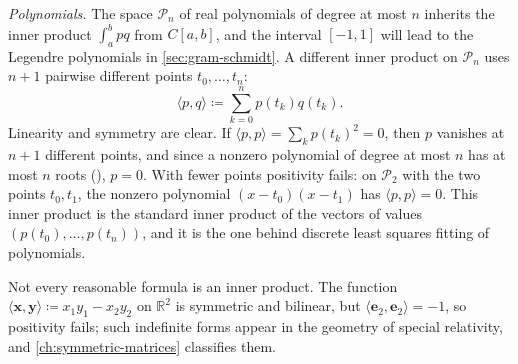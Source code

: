 \emph{Polynomials.} The space $\mathcal P_n$ of real polynomials of degree at most $n$ inherits the inner product $\int_a^bpq$ from $C[a,b]$, and the interval $[-1,1]$ will lead to the Legendre polynomials in \cref{sec:gram-schmidt}. A different inner product on $\mathcal P_n$ uses $n+1$ pairwise different points $t_0,\ldots,t_n$:
\[
\langle p,q\rangle\coloneqq\sum_{k=0}^np(t_k)q(t_k).
\]
Linearity and symmetry are clear. If $\langle p,p\rangle=\sum_kp(t_k)^2=0$, then $p$ vanishes at $n+1$ different points, and since a nonzero polynomial of degree at most $n$ has at most $n$ roots (), $p=0$. With fewer points positivity fails: on $\mathcal P_2$ with the two points $t_0,t_1$, the nonzero polynomial $(x-t_0)(x-t_1)$ has $\langle p,p\rangle=0$. This inner product is the standard inner product of the vectors of values $(p(t_0),\ldots,p(t_n))$, and it is the one behind discrete least squares fitting of polynomials.

Not every reasonable formula is an inner product. The function $\langle\mathbf x,\mathbf y\rangle\coloneqq x_1y_1-x_2y_2$ on $\mathbb R^2$ is symmetric and bilinear, but $\langle\mathbf e_2,\mathbf e_2\rangle=-1$, so positivity fails; such indefinite forms appear in the geometry of special relativity, and \cref{ch:symmetric-matrices} classifies them.

\begin{table}
\end{table}

